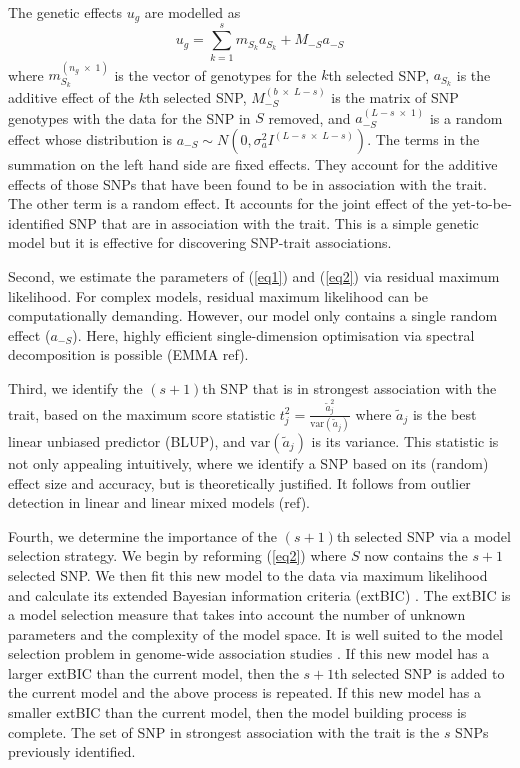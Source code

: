 \documentclass{article}
\begin{document}
The genetic effects $u_g$ are modelled as 
\begin{equation}
\label{eq2}
u_g = \sum_{k=1}^s  m_{S_k} a_{S_k} + M_{-S} a_{-S}
\end{equation}
where $m_{S_k}^{(n_g \; \times \; 1)}$ is the vector of genotypes for the  $k$th selected SNP, 
$a_{S_k}$ is the additive effect of the $k$th selected SNP, $M_{-S}^{(b \; \times \; L-s)}$ is the matrix of  SNP genotypes 
with the data for the SNP in $S$ removed,  and $a_{-S}^{(L-s \; \times  \; 1)}$ is a random effect whose distribution is 
$a_{-S} \sim N(0, \sigma_a^2 I^{(L-s \; \times \;  L-s)})$. 
The terms in the summation on the left hand side are fixed effects.   They account 
for the additive effects of those SNPs that have been found to be in association with the trait. The other term is a random effect. 
It accounts for the joint effect of the yet-to-be-identified SNP that are in association with the trait. 
This is a simple genetic model but it 
is effective for discovering SNP-trait associations. 


Second, we estimate the parameters of (\ref{eq1}) and (\ref{eq2}) via residual maximum likelihood.  For complex models, residual maximum likelihood
can be computationally demanding. However, our model only contains a single random effect ($a_{-S}$). Here, highly efficient single-dimension 
optimisation via spectral decomposition is possible (EMMA ref). 

Third, we identify the $(s+1)$th SNP that is in strongest association with the trait, based on the maximum score statistic
$t_j^2 = \frac{ \widetilde{a} _j^2}{\textrm{var}(\widetilde{a}_j)}$ where $\widetilde{a}_j$ is the best linear unbiased predictor (BLUP), 
and $\textrm{var}(\widetilde{a}_j)$ is its variance. This statistic is not only appealing intuitively, where we 
identify a SNP based on its (random) effect size and accuracy, but is theoretically justified.  It follows from outlier detection 
in linear and linear mixed models (ref). 

Fourth, we determine the importance of the $(s+1)$th selected SNP via a model selection strategy. 
We begin by reforming (\ref{eq2}) where $S$ now contains the $s + 1$ selected SNP.  We then fit this new model to the data
via maximum likelihood and calculate its extended Bayesian information criteria (extBIC) \cite{chen2008extended}.  The 
extBIC is a model selection measure that takes into account the number of unknown parameters and the complexity 
of the model space.  It is well suited to the model selection problem in genome-wide association studies \cite{chen2008extended}. If this new model has a larger extBIC than the current model, then the $s+1$th selected SNP is added to 
the current model and the above process is repeated. If this new model has a smaller extBIC than the current model, then the 
model building process is complete. The set of SNP in strongest association with the trait is the $s$ SNPs previously identified. 
\end{document}
